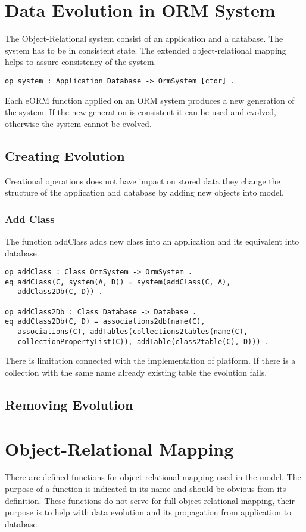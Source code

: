 \documentclass[11pt]{article}
\begin{document}
\section{Data Evolution in ORM System}
The Object-Relational system consist of an application and a database. The system has to be in consistent state. The extended object-relational mapping helps to assure consistency of the system.
\begin{verbatim}
op system : Application Database -> OrmSystem [ctor] .
\end{verbatim}
Each eORM function applied on an ORM system produces a new generation of the system. If the new generation is consistent it can be used and evolved, otherwise the system cannot be evolved.

\subsection{Creating Evolution}
Creational operations does not have impact on stored data they change the structure of the application and database by adding new objects into model.

\subsubsection{Add Class}
The function addClass adds new class into an application and its equivalent into database. 
\begin{verbatim}
op addClass : Class OrmSystem -> OrmSystem .
eq addClass(C, system(A, D)) = system(addClass(C, A), 
   addClass2Db(C, D)) .

op addClass2Db : Class Database -> Database .
eq addClass2Db(C, D) = associations2db(name(C), 
   associations(C), addTables(collections2tables(name(C), 
   collectionPropertyList(C)), addTable(class2table(C), D))) .
\end{verbatim}

There is limitation connected with the implementation of platform. If there is a collection with the same name already existing table the evolution fails.

\subsection{Removing Evolution}



\newpage
\appendix
\section{Object-Relational Mapping}
There are defined functions for object-relational mapping used in the model. The purpose of a function is indicated in its name and should be obvious from its definition. These functions do not serve for full object-relational mapping, their purpose is to help with data evolution and its propagation from application to database.
\end{document}
